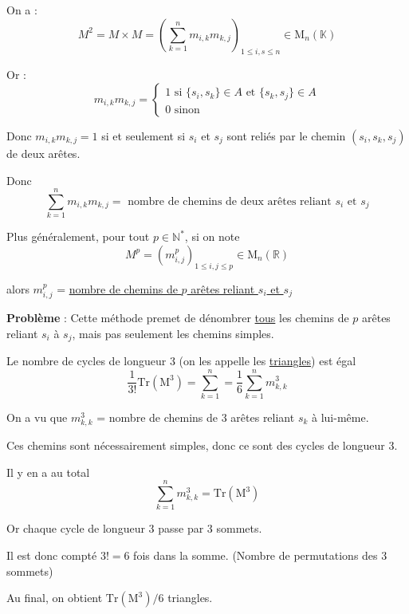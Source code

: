 On a : 
\begin{equation}
  M ^{2} = M \times M = \left( \sum_{k=1}^{n} m _{i,k} m _{k,j}\right) _{1 \le i, s \le n} \in   \mathrm{M} _ n (\mathbb{K})
\end{equation}

Or : 
\begin{equation}
  m _{i,k} m _{k,j} = \begin{cases}
    1 \text{ si } \{ s_i, s_k \} \in A \text{ et } \{s_k, s_j\} \in A \\
    0 \text{ sinon}
  \end{cases}
\end{equation}

Donc $m _{i,k} m _{k,j} = 1$ si et seulement si $s_i$ et $s_j$ sont reliés par le chemin $(s_i, s_k, s_j)$ de deux arêtes. 

Donc 
\begin{equation}
  \sum_{k=1}^{n} m _{i,k} m _{k,j} = \text{ nombre de chemins de deux arêtes reliant } s_i \text{ et } s_j
\end{equation}

Plus généralement, pour tout $p \in \mathbb{N} ^{*}$, si on note 
\begin{equation}
  M ^{p}= \left( m _{i,j} ^{p} \right) _{1 \le i, j \le p} \in \mathrm{M} _n (\mathbb{R})
\end{equation} 


alors $m_{i,j} ^{p}$ = \underline{nombre de chemins de $p$ arêtes reliant $s_i$ et $s_j$}

\textbf{Problème} : Cette méthode premet de dénombrer \underline{tous} les chemins de $p$ arêtes reliant $s_i$ à $s_j$, mais pas seulement les chemins simples. 

\begin{Theorem}{}{}
Le nombre de cycles de longueur 3 (on les appelle les \underline{triangles}) est égal 
\begin{equation}
\frac{1}{3!}   \mathrm{Tr}(\mathrm{M} ^{3}) = \sum_{k=1}^{n} = \frac{1}{6}  \sum_{k=1}^{n} m _{k,k} ^{3}
\end{equation}
\end{Theorem}

\begin{myproof}{}{}
On a vu que $m _{k,k} ^{3}$ = nombre de chemins de 3 arêtes reliant $s_k$ à lui-même. 

Ces chemins sont nécessairement simples, donc ce sont des cycles de longueur 3.

Il y en a au total 
\begin{equation}
  \sum_{k=1}^{n} m _{k, k} ^{3} = \mathrm{Tr} ( \mathrm{M} ^{3})
\end{equation}

Or chaque cycle de longueur 3 passe par 3 sommets.

Il est donc compté $3! = 6$ fois dans la somme. (Nombre de permutations des 3 sommets)

Au final, on obtient $\mathrm{Tr}(\mathrm{M} ^{3}) / 6$ triangles.
\end{myproof}

